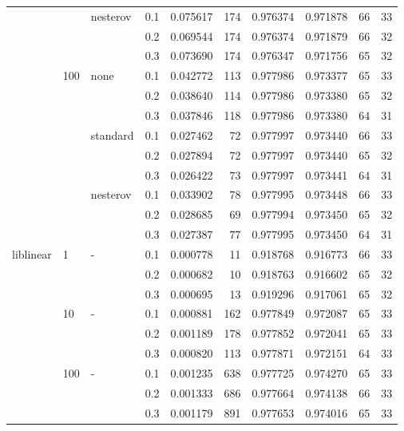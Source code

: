 \begin{table}[H]
\begin{tabular}{llllrrrrrr}
          &     & nesterov & 0.1 &  0.075617 &     174 &  0.976374 &  0.971878 &          66 &        33 \\
          &     &   & 0.2 &  0.069544 &     174 &  0.976374 &  0.971879 &          66 &        32 \\
          &     &   & 0.3 &  0.073690 &     174 &  0.976347 &  0.971756 &          65 &        32 \\
          & 100 & none & 0.1 &  0.042772 &     113 &  0.977986 &  0.973377 &          65 &        33 \\
          &     &   & 0.2 &  0.038640 &     114 &  0.977986 &  0.973380 &          65 &        32 \\
          &     &   & 0.3 &  0.037846 &     118 &  0.977986 &  0.973380 &          64 &        31 \\
          &     & standard & 0.1 &  0.027462 &      72 &  0.977997 &  0.973440 &          66 &        33 \\
          &     &   & 0.2 &  0.027894 &      72 &  0.977997 &  0.973440 &          65 &        32 \\
          &     &   & 0.3 &  0.026422 &      73 &  0.977997 &  0.973441 &          64 &        31 \\
          &     & nesterov & 0.1 &  0.033902 &      78 &  0.977995 &  0.973448 &          66 &        33 \\
          &     &   & 0.2 &  0.028685 &      69 &  0.977994 &  0.973450 &          65 &        32 \\
          &     &   & 0.3 &  0.027387 &      77 &  0.977995 &  0.973450 &          64 &        31 \\
liblinear & 1   & - & 0.1 &  0.000778 &      11 &  0.918768 &  0.916773 &          66 &        33 \\
          &     &   & 0.2 &  0.000682 &      10 &  0.918763 &  0.916602 &          65 &        32 \\
          &     &   & 0.3 &  0.000695 &      13 &  0.919296 &  0.917061 &          65 &        32 \\
          & 10  & - & 0.1 &  0.000881 &     162 &  0.977849 &  0.972087 &          65 &        33 \\
          &     &   & 0.2 &  0.001189 &     178 &  0.977852 &  0.972041 &          65 &        33 \\
          &     &   & 0.3 &  0.000820 &     113 &  0.977871 &  0.972151 &          64 &        33 \\
          & 100 & - & 0.1 &  0.001235 &     638 &  0.977725 &  0.974270 &          65 &        33 \\
          &     &   & 0.2 &  0.001333 &     686 &  0.977664 &  0.974138 &          66 &        33 \\
          &     &   & 0.3 &  0.001179 &     891 &  0.977653 &  0.974016 &          65 &        33 \\
\bottomrule
\end{tabular}
\end{table}
